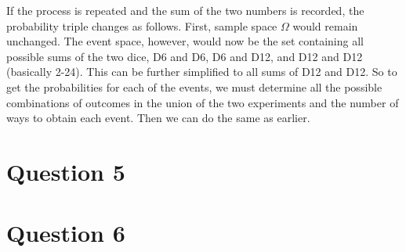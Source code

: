 \documentclass{article}[12 pt]
\begin{document}
\noindent
If the process is repeated and the sum of the two numbers is recorded, the probability triple changes as follows.  First, sample space $\Omega$ would remain unchanged.  The event space, however, would now be the set containing all possible sums of the two dice, D6 and D6, D6 and D12, and D12 and D12 (basically 2-24).  This can be further simplified to all sums of D12 and D12.  So to get the probabilities for each of the events, we must determine all the possible combinations of outcomes in the union of the two experiments and the number of ways to obtain each event.  Then we can do the same as earlier.


\section*{Question 5}

\section*{Question 6}
\end{document}
